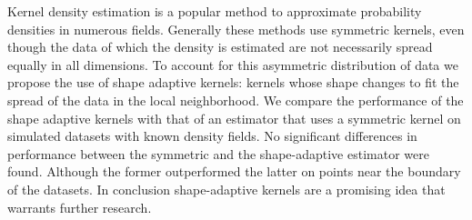 \noindent Kernel density estimation is a popular method to approximate probability densities in numerous fields.
Generally these methods use symmetric kernels, even though the data of which the density is estimated are not necessarily spread equally in all dimensions. To account for this asymmetric distribution of data we propose the use of shape adaptive kernels: kernels whose shape changes to fit the spread of the data in the local neighborhood.
We compare the performance of the shape adaptive kernels with that of an estimator that uses a symmetric kernel on simulated datasets with known density fields.
No significant differences in performance between the symmetric and the shape-adaptive estimator were found. Although the former outperformed the latter on points near the boundary of the datasets. 
In conclusion shape-adaptive kernels are a promising idea that warrants further research.
